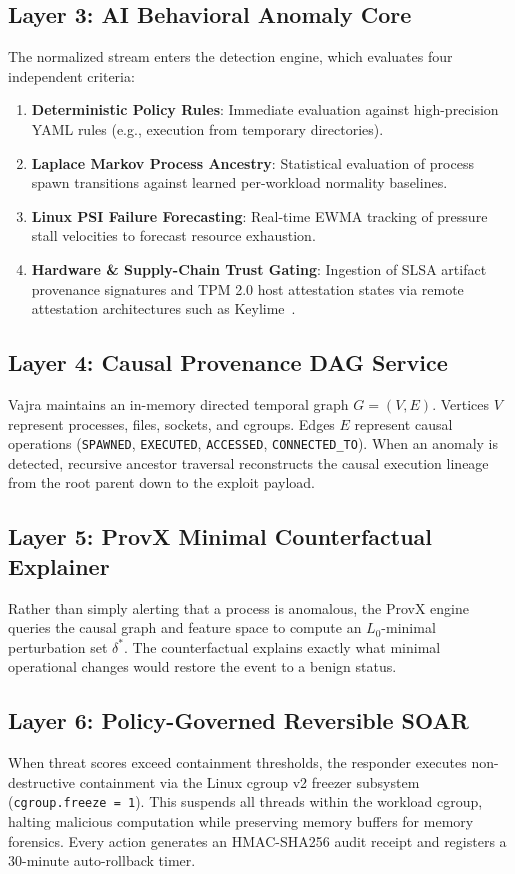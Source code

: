 \documentclass[conference]{IEEEtran}
\begin{document}
\subsection{Layer 3: AI Behavioral Anomaly Core}
The normalized stream enters the detection engine, which evaluates four independent criteria:
\begin{enumerate}
    \item \textbf{Deterministic Policy Rules}: Immediate evaluation against high-precision YAML rules (e.g., execution from temporary directories).
    \item \textbf{Laplace Markov Process Ancestry}: Statistical evaluation of process spawn transitions against learned per-workload normality baselines.
    \item \textbf{Linux PSI Failure Forecasting}: Real-time EWMA tracking of pressure stall velocities to forecast resource exhaustion.
    \item \textbf{Hardware \& Supply-Chain Trust Gating}: Ingestion of SLSA artifact provenance signatures and TPM 2.0 host attestation states via remote attestation architectures such as Keylime~\cite{keylime2022}.
\end{enumerate}

\subsection{Layer 4: Causal Provenance DAG Service}
Vajra maintains an in-memory directed temporal graph $G = (V, E)$. Vertices $V$ represent processes, files, sockets, and cgroups. Edges $E$ represent causal operations (\texttt{SPAWNED}, \texttt{EXECUTED}, \texttt{ACCESSED}, \texttt{CONNECTED\_TO}). When an anomaly is detected, recursive ancestor traversal reconstructs the causal execution lineage from the root parent down to the exploit payload.

\subsection{Layer 5: ProvX Minimal Counterfactual Explainer}
Rather than simply alerting that a process is anomalous, the ProvX engine queries the causal graph and feature space to compute an $L_0$-minimal perturbation set $\delta^*$. The counterfactual explains exactly what minimal operational changes would restore the event to a benign status.

\subsection{Layer 6: Policy-Governed Reversible SOAR}
When threat scores exceed containment thresholds, the responder executes non-destructive containment via the Linux cgroup v2 freezer subsystem~\cite{linux_cgroup2} (\texttt{cgroup.freeze = 1}). This suspends all threads within the workload cgroup, halting malicious computation while preserving memory buffers for memory forensics. Every action generates an HMAC-SHA256 audit receipt and registers a 30-minute auto-rollback timer.
\end{document}
